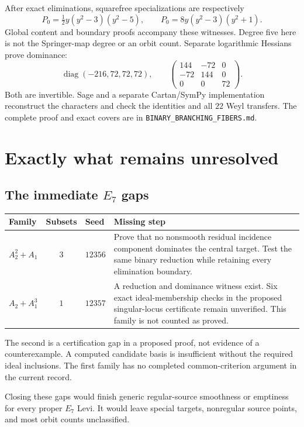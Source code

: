 \documentclass[11pt]{article}
\newcommand{\record}[1]{{\small\nolinkurl{#1}}}
\begin{document}
After exact eliminations, squarefree specializations are respectively
\[
 P_0=\tfrac12 y(y^2-3)(y^2-5),\qquad
 P_0=8y(y^2-3)(y^2+1).
\]
Global content and boundary proofs accompany these witnesses. Degree five here is not the Springer-map degree or an orbit count. Separate logarithmic Hessians prove dominance:
\[
 \operatorname{diag}(-216,72,72,72),\qquad
 \begin{pmatrix}144&-72&0\\-72&144&0\\0&0&72\end{pmatrix}.
\]
Both are invertible. Sage and a separate Cartan/SymPy implementation reconstruct the characters and check the identities and all $22$ Weyl transfers. The complete proof and exact covers are in \record{BINARY_BRANCHING_FIBERS.md}.

\section{Exactly what remains unresolved}

\subsection{The immediate $E_7$ gaps}

\begin{center}
\begin{tabularx}{\textwidth}{@{}lclX@{}}
\toprule
Family & Subsets & Seed & Missing step\\
\midrule
$A_2^2+A_1$ & $3$ & $12356$ &
Prove that no nonsmooth residual incidence component dominates the central target. Test the same binary reduction while retaining every elimination boundary.\\[5pt]
$A_2+A_1^3$ & $1$ & $12357$ &
A reduction and dominance witness exist. Six exact ideal-membership checks in the proposed singular-locus certificate remain unverified. This family is not counted as proved.\\
\bottomrule
\end{tabularx}
\end{center}

The second is a certification gap in a proposed proof, not evidence of a counterexample. A computed candidate basis is insufficient without the required ideal inclusions. The first family has no completed common-criterion argument in the current record.

Closing these gaps would finish generic regular-source smoothness or emptiness for every proper $E_7$ Levi. It would leave special targets, nonregular source points, and most orbit counts unclassified.
\end{document}
